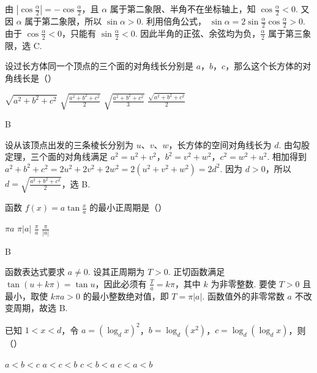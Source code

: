\begin{solution}
由 \(\left|\cos\frac\alpha2\right|=-\cos\frac\alpha2\)，且 \(\alpha\) 属于第二象限、半角不在坐标轴上，知 \(\cos\frac\alpha2<0\). 又因 \(\alpha\) 属于第二象限，所以 \(\sin\alpha>0\). 利用倍角公式，
\(\sin\alpha=2\sin\frac\alpha2\cos\frac\alpha2>0\). 由于 \(\cos\frac\alpha2<0\)，只能有 \(\sin\frac\alpha2<0\). 因此半角的正弦、余弦均为负，\(\frac\alpha2\) 属于第三象限，选 C.
\end{solution}

\begin{problem}
设过长方体同一个顶点的三个面的对角线长分别是 \(a\)，\(b\)，\(c\)，那么这个长方体的对角线长是（\quad）

\choices
    {\(\sqrt{a^2+b^2+c^2}\)}
    {\(\sqrt{\frac{a^2+b^2+c^2}{2}}\)}
    {\(\sqrt{\frac{a^2+b^2+c^2}{3}}\)}
    {\(\frac{\sqrt{a^2+b^2+c^2}}{2}\)}
\end{problem}

\begin{answer}
B
\end{answer}

\begin{solution}
设从该顶点出发的三条棱长分别为 \(u\)、\(v\)、\(w\)，长方体的空间对角线长为 \(d\). 由勾股定理，三个面的对角线满足
\(a^2=u^2+v^2\)，\(b^2=v^2+w^2\)，\(c^2=w^2+u^2\). 相加得到
\(a^2+b^2+c^2=2u^2+2v^2+2w^2=2\left(u^2+v^2+w^2\right)=2d^2\). 因为 \(d>0\)，所以 \(d=\sqrt{\frac{a^2+b^2+c^2}{2}}\)，选 B.
\end{solution}

\begin{problem}
函数 \(f(x)=a\tan\frac{x}{a}\) 的最小正周期是（\quad）

\choices
    {\(\pi a\)}
    {\(\pi|a|\)}
    {\(\frac{\pi}{a}\)}
    {\(\frac{\pi}{|a|}\)}
\end{problem}

\begin{answer}
B
\end{answer}

\begin{solution}
函数表达式要求 \(a\ne0\). 设其正周期为 \(T>0\). 正切函数满足 \(\tan(u+k\pi)=\tan u\)，因此必须有 \(\frac{T}{a}=k\pi\)，其中 \(k\) 为非零整数. 要使 \(T>0\) 且最小，取使 \(k\pi a>0\) 的最小整数绝对值，即 \(T=\pi|a|\). 函数值外的非零常数 \(a\) 不改变周期，故选 B.
\end{solution}

\begin{problem}
已知 \(1<x<d\)，令 \(a=\left(\log_d x\right)^2\)，\(b=\log_d\left(x^2\right)\)，\(c=\log_d\left(\log_d x\right)\)，则（\quad）

\choices
    {\(a<b<c\)}
    {\(a<c<b\)}
    {\(c<b<a\)}
    {\(c<a<b\)}
\end{problem}

